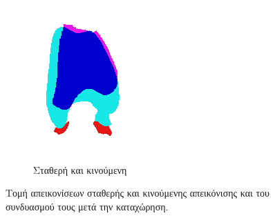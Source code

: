 \documentclass[a4paper,12pt]{article}
\begin{document}
\begin{figure}[H]
    \begin{subfigure}[t]{0.4\linewidth}
    \includegraphics[width=\linewidth]{combination_label_before_registration_3.png}
    \caption{Σταθερή και κινούμενη}
    \end{subfigure}

    \caption{Τομή απεικονίσεων σταθερής και κινούμενης απεικόνισης και του
             συνδυασμού τους μετά την καταχώρηση.}
    \label{fig:registration_before:3}
\end{figure}
\end{document}
